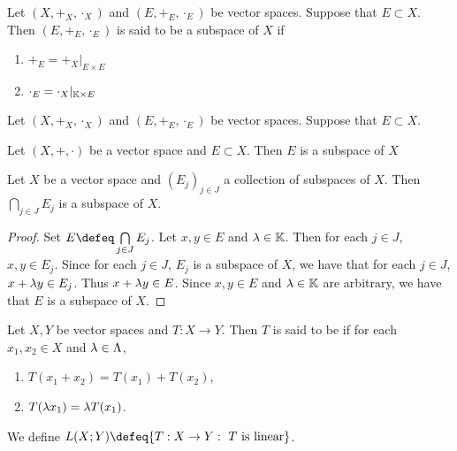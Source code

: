 \documentclass{book}
\begin{document}
	\begin{defn}
		Let $(X, +_X, \cdot_X)$ and $(E, +_E, \cdot_E)$ be vector spaces. Suppose that $E \subset X$. Then $(E, +_E, \cdot_E)$ is said to be a subspace of $X$ if 
		\begin{enumerate}
			\item $+_E = +_X|_{E \times E}$
			\item $\cdot_E = \cdot_X|_{\mathbb{K} \times E}$
		\end{enumerate}
	\end{defn}

	\begin{ex}
		Let $(X, +_X, \cdot_X)$ and $(E, +_E, \cdot_E)$ be vector spaces. Suppose that $E \subset X$. 
	\end{ex}
	
	\begin{ex}
		Let $(X, +, \cdot)$ be a vector space and $E \subset X$. Then $E$ is a subspace of $X$
	\end{ex}
	
	
	\begin{defn}
		Let $X$ be a vector space and $(E_j)_{j \in J}$ a collection of subspaces of $X$. Then $\bigcap\limits_{j \in J}E_j$ is a subspace of $X$. 
	\end{defn}

	\begin{proof}
		Set $E \defeq \bigcap\limits_{j \in J}E_j$. Let $x,y \in E$ and $\lambda \in \mathbb{K}$. Then for each $j \in J$, $x,y \in E_j$. Since for each $j \in J$, $E_j$ is a subspace of $X$, we have that for each $j \in J$, $x+ \lambda y \in E_j$. Thus $x+\lambda y \in E$. Since $x,y \in E$ and $\lambda \in \mathbb{K}$ are arbitrary,  we have that $E$ is a subspace of $X$. 
	\end{proof}
	
	
	
	
	
	
	
	
	
	
	
	
	
	
	
	
	
	
	
	
	
	
	
	
	
	
	\begin{defn}
		Let $X, Y$ be vector spaces and $T:X \rightarrow Y$. Then $T$ is said to be  if for each $x_1, x_2 \in X$ and $\lambda \in \Lambda$, 
		\begin{enumerate}
			\item $T(x_1 + x_2) = T(x_1) + T(x_2)$,
			\item $T(\lambda x_1) = \lambda T(x_1)$.
		\end{enumerate}
		We define $L(X;Y) \defeq \{T:X \rightarrow Y: \text{ $T$ is linear}\}$. 
	\end{defn}
	
\end{document}
